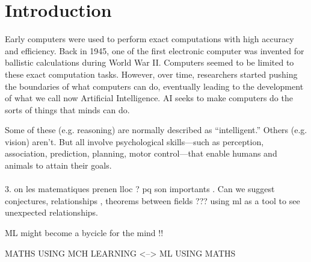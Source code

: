 \documentclass[../main.tex]{subfiles}
\begin{document}
    \chapter{Introduction} \label{ch:intro}
    


\noindent Early computers were used to perform exact computations with high accuracy and efficiency. Back in 1945, one of the first electronic computer was invented for ballistic calculations during World War II. Computers seemed to be limited to these exact computation tasks. However, over time, researchers started pushing the boundaries of what computers can do, eventually leading to the development of what we call now Artificial Intelligence. AI  seeks to make computers do the sorts of things that minds can do.

    
    
    Some of these (e.g. reasoning) are normally described as “intelligent.” Others (e.g. vision) aren’t. But all involve psychological
    skills—such as perception, association, prediction, planning, motor
    control—that enable humans and animals to attain their goals. \\ \\
    
    3. on les matematiques prenen lloc ? pq son importants .  Can we suggest conjectures, relationships , theorems between fields ??? using ml as a tool to see unexpected relationships. 
    
    ML might become a bycicle for the mind !!
    
    MATHS USING MCH LEARNING <--> ML USING MATHS  
    
   
\end{document}
